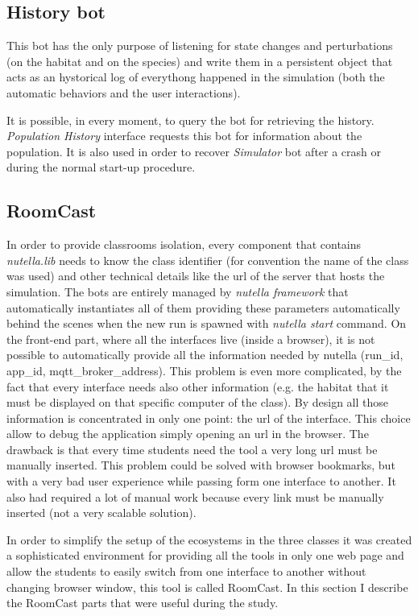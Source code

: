\subsection{History bot}
This bot has the only purpose of listening for state changes and perturbations (on the habitat and on the species) and write them in a persistent object that acts as an hystorical log of everythong happened in the simulation (both the automatic behaviors and the user interactions).

It is possible, in every moment, to query the bot for retrieving the history. \textit{Population History} interface requests this bot for information about the population. It is also used in order to recover \textit{Simulator} bot after a crash or during the normal start-up procedure.

\subsection{RoomCast}
In order to provide classrooms isolation, every component that contains \textit{nutella.lib} needs to know the class identifier (for convention the name of the class was used) and other technical details like the url of the server that hosts the simulation. The bots are entirely managed by \textit{nutella framework} that automatically instantiates all of them providing these parameters automatically behind the scenes when the new run is spawned with \textit{nutella start} command. On the front-end part, where all the interfaces live (inside a browser), it is not possible to automatically provide all the information needed by nutella (run\_id, app\_id, mqtt\_broker\_address). This problem is even more complicated, by the fact that every interface needs also other information (e.g. the habitat that it must be displayed on that specific computer of the class). By design all those information is concentrated in only one point: the url of the interface. This choice allow to debug the application simply opening an url in the browser. The drawback is that every time students need the tool a very long url must be manually inserted. This problem could be solved with browser bookmarks, but with a very bad user experience while passing form one interface to another. It also had required a lot of manual work because every link must be manually inserted (not a very scalable solution).

In order to simplify the setup of the ecosystems in the three classes it was created a sophisticated environment for providing all the tools in only one web page and allow the students to easily switch from one interface to another without changing browser window, this tool is called RoomCast. In this section I describe the RoomCast parts that were useful during the study.

